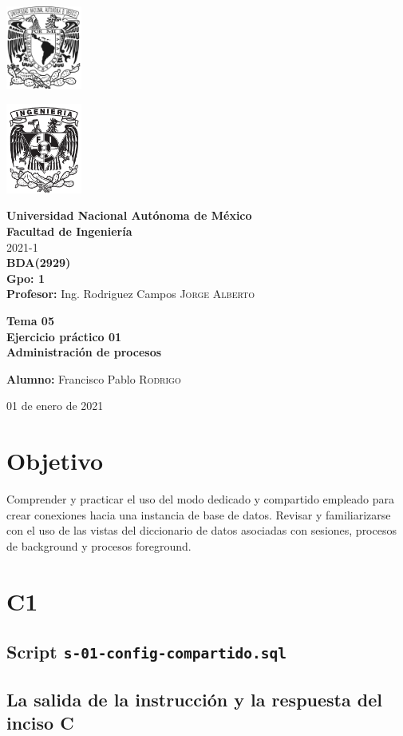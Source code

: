 \documentclass{article}
\newcommand{\coverPage}{
\thispagestyle{empty}
  \begin{minipage}[t][5cm][t]{0.2\linewidth}
    \includegraphics[width=2.5cm]{unam.jpg}

    \vspace{10cm}

    \includegraphics[width=2.5cm]{fiblack}
  \end{minipage}
  \begin{minipage}[t]{0.7\linewidth}
    \vspace{-2.5cm}
    \LARGE{\textbf{\university}}\\
    \Large{\textbf{\faculty}} \\
  
    \large{\semestre}\\[2cm]
  
    \large{\textbf{\materia (\clave)}}\\
    \large{\textbf{Gpo: \grupo}}\\[5mm]
    \large{\textbf{Profesor:} \profesor}\\ [1.5cm]
    \begin{center}
        \LARGE{\textbf{\actividad}}\\
        \LARGE{\textbf{\titulo}}\\
    \end{center}
  
    \vspace{3.3cm}
  
    \large{\textbf{Alumno:} \alumno} \\[1.5cm]
  
    \begin{flushright}
        \fechaEntrega%
    \end{flushright}
  \end{minipage}

\newpage
}
\begin{document}

\newcommand{\university}{Universidad Nacional Autónoma de México}
\newcommand{\faculty}{Facultad de Ingeniería}
\newcommand{\semestre}{2021-1}
\newcommand{\materia}{BDA}
\newcommand{\clave}{2929}
\newcommand{\grupo}{1}
\newcommand{\profesor}{Ing. Rodriguez Campos \textsc{Jorge Alberto}}

\newcommand{\alumno}{Francisco Pablo \textsc{Rodrigo}}
\newcommand{\actividad}{Tema 05 \\ Ejercicio práctico 01}
\newcommand{\titulo}{Administración de procesos}

\newcommand{\fechaEntrega}{01 de enero de 2021}

\newcommand{\baseDir}{tema05-ej-prac-01}
\newcommand{\codedir}{\baseDir-codigo}
\graphicspath{{assets/}{\baseDir.assets/}}

\coverPage%



\section*{Objetivo}

Comprender y practicar el uso del modo dedicado y compartido empleado para 
crear conexiones hacia una instancia de base de datos. Revisar y familiarizarse 
con el uso de las vistas del diccionario de datos asociadas con sesiones, 
procesos de background y procesos foreground.

\section*{C1}

\subsection*{Script \texttt{s-01-config-compartido.sql}}



\subsection*{La salida de la instrucción y la respuesta del inciso C}
\end{document}
